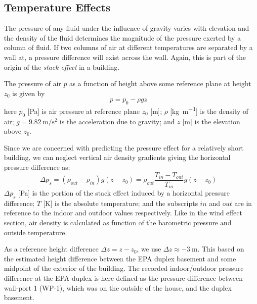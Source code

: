 \subsection{Temperature Effects}

The pressure of any fluid under the influence of gravity varies with elevation and the density of the fluid determines the magnitude of the pressure exerted by a column of fluid.
If two columns of air at different temperatures are separated by a wall at, a pressure difference will exist across the wall.
Again, this is part of the origin of the \textit{stack effect} in a building.\par

The pressure of air $p$ as a function of height above some reference plane at height $z_0$ is given by
\begin{equation}
  p = p_0 - \rho g z
\end{equation}
here $p_0$ [\si{\pascal}] is air pressure at reference plane $z_0$ [\si{\metre}];
$\rho$ [\si{\kilo\gram\per\metre}] is the density of air;
$g = \SI{9.82}{\metre\per\second\squared}$ is the acceleration due to gravity;
and $z$ [\si{\metre}] is the elevation above $z_0$.\par

Since we are concerned with predicting the pressure effect for a relatively short building, we can neglect vertical air density gradients giving the horizontal pressure difference as:
\begin{equation}
  \Delta p_s = (\rho_{out} - \rho_{in}) g (z - z_0) = \rho_{out} \frac{T_{in} - T_{out}}{T_{in}} g (z - z_0)
\end{equation}
$\Delta p_s$ [\si{\pascal}] is the portion of the stack effect induced by a horizontal pressure difference;
$T$ [\si{\kelvin}] is the absolute temperature;
and the subscripts $in$ and $out$ are in reference to the indoor and outdoor values respectively.
Like in the wind effect section, air density is calculated as function of the barometric pressure and outside temperature.\par

As a reference height difference $\Delta z = z - z_0$, we use $\Delta z \approx \SI{-3}{\metre}$.
This based on the estimated height difference between the EPA duplex basement and some midpoint of the exterior of the building.
The recorded indoor/outdoor pressure difference at the EPA duplex is here defined as the pressure difference between wall-port 1 (WP-1), which was on the outside of the house, and the duplex basement.\par

